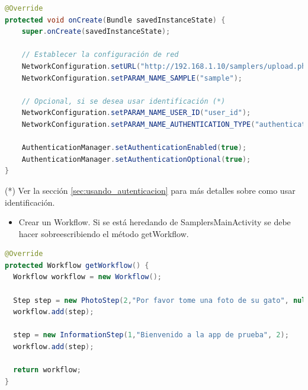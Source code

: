 \begin{lstlisting}[language=Java, frame=tlbr, caption=Ejemplo de configuración general]
@Override
protected void onCreate(Bundle savedInstanceState) {
	super.onCreate(savedInstanceState);
	
	// Establecer la configuración de red
	NetworkConfiguration.setURL("http://192.168.1.10/samplers/upload.php");
	NetworkConfiguration.setPARAM_NAME_SAMPLE("sample");

	// Opcional, si se desea usar identificación (*)
	NetworkConfiguration.setPARAM_NAME_USER_ID("user_id");
	NetworkConfiguration.setPARAM_NAME_AUTHENTICATION_TYPE("authentication_type");

	AuthenticationManager.setAuthenticationEnabled(true);
	AuthenticationManager.setAuthenticationOptional(true);
}
\end{lstlisting}
		
		
(*) Ver la sección \ref{sec:usando_autenticacion} para más detalles sobre como usar identificación.

\begin{itemize}
	\item Crear un Workflow. Si se está heredando de SamplersMainActivity se debe hacer sobreescribiendo el método getWorkflow.
\end{itemize}	

\begin{lstlisting}[language=Java, frame=tlbr, caption=Ejemplo de un Workflow que tiene dos Steps. El primero muestra un mensaje de bienvenida y el segundo pide para tomar una foto.]
@Override
protected Workflow getWorkflow() {
  Workflow workflow = new Workflow();

  Step step = new PhotoStep(2,"Por favor tome una foto de su gato", null);
  workflow.add(step);

  step = new InformationStep(1,"Bienvenido a la app de prueba", 2);
  workflow.add(step);

  return workflow;
}		
\end{lstlisting}
	

